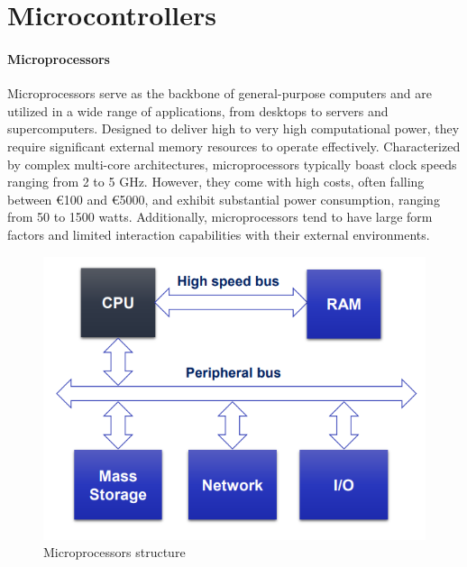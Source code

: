 \section{Microcontrollers}

\paragraph*{Microprocessors}
Microprocessors serve as the backbone of general-purpose computers and are utilized in a wide range of applications, from desktops to servers and supercomputers. 
Designed to deliver high to very high computational power, they require significant external memory resources to operate effectively. 
Characterized by complex multi-core architectures, microprocessors typically boast clock speeds ranging from 2 to 5 GHz. However, they come with high costs, often falling between €100 and €5000, and exhibit substantial power consumption, ranging from 50 to 1500 watts. 
Additionally, microprocessors tend to have large form factors and limited interaction capabilities with their external environments.
\begin{figure}[H]
    \centering
    \includegraphics[width=0.75\linewidth]{images/micpro.png}
    \caption{Microprocessors structure}
\end{figure}

